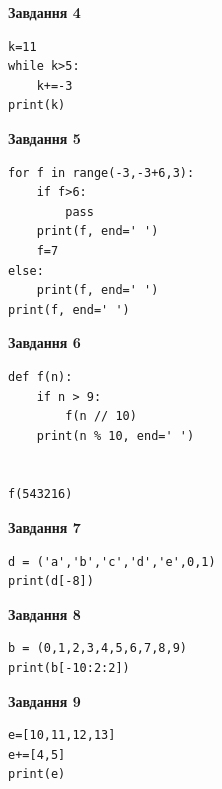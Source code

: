 \documentclass[12pt, ukrainian]{article}
\begin{document}
{{{{{{{{{{{{{{{{{{\begin{minipage}[t]{7.5cm}
\begin{center}
\textbf{Завдання 4}
\end{center}

\begin{verbatim}
k=11
while k>5:
    k+=-3
print(k)
\end{verbatim}

\end{minipage}
\vline \hspace{6mm}
\begin{minipage}[t]{10.5cm}

\begin{center}
\textbf{Завдання 5}
\end{center}

\begin{verbatim}
for f in range(-3,-3+6,3):
    if f>6:
        pass
    print(f, end=' ')
    f=7
else:
    print(f, end=' ')
print(f, end=' ')
\end{verbatim}



\begin{center}
\textbf{Завдання 6}
\end{center}

\begin{verbatim}
def f(n):
    if n > 9:
        f(n // 10)
    print(n % 10, end=' ')
    

f(543216)
\end{verbatim}



\begin{center}
\textbf{Завдання 7}
\end{center}

\begin{verbatim}
d = ('a','b','c','d','e',0,1)
print(d[-8])
\end{verbatim}



\begin{center}
\textbf{Завдання 8}
\end{center}

\begin{verbatim}
b = (0,1,2,3,4,5,6,7,8,9)
print(b[-10:2:2])
\end{verbatim}



\begin{center}
\textbf{Завдання 9}
\end{center}

\begin{verbatim}
e=[10,11,12,13]
e+=[4,5]
print(e)
\end{verbatim}




\end{minipage}}}}}}}}}}}}}}}}}}}
\end{document}
